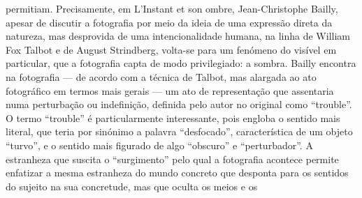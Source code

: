 \documentclass{article}
\begin{document}
permitiam. Precisamente, em L’Instant et son ombre, Jean-Christophe Bailly, apesar
de discutir a fotografia por meio da ideia de uma expressão direta da natureza, mas
desprovida de uma intencionalidade humana, na linha de William Fox Talbot e de
August Strindberg, volta-se para um fenómeno do visível em particular, que a fotografia capta de modo privilegiado: a sombra. Bailly encontra na fotografia — de
acordo com a técnica de Talbot, mas alargada ao ato fotográfico em termos mais gerais — um ato de representação que assentaria numa perturbação ou indefinição,
definida pelo autor no original como “trouble”. O termo “trouble” é particularmente
interessante, pois engloba o sentido mais literal, que teria por sinónimo a palavra
“desfocado”, característica de um objeto “turvo”, e o sentido mais figurado de algo
“obscuro” e “perturbador”. A estranheza que suscita o “surgimento” pelo qual a fotografia acontece permite enfatizar a mesma estranheza do mundo concreto que desponta para os sentidos do sujeito na sua concretude, mas que oculta os meios e os
\end{document}
